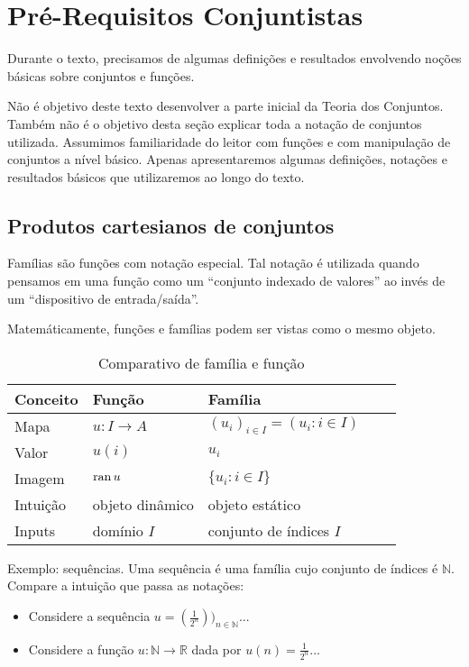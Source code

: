 
\chapter{Pré-Requisitos Conjuntistas}
Durante o texto, precisamos de algumas definições e resultados envolvendo noções básicas sobre conjuntos e funções.

Não é objetivo deste texto desenvolver a parte inicial da Teoria dos Conjuntos. Também não é o objetivo desta seção explicar toda a notação de conjuntos utilizada. Assumimos familiaridade do leitor com funções e com manipulação de conjuntos a nível básico. Apenas apresentaremos algumas definições, notações e resultados básicos que utilizaremos ao longo do texto.

\section{Produtos cartesianos de conjuntos}

Famílias são funções com notação especial. Tal notação é utilizada quando pensamos em uma função como um ``conjunto indexado de valores'' ao invés de um ``dispositivo de entrada/saída''.

Matemáticamente, funções e famílias podem ser vistas como o mesmo objeto.
\begin{table}[h]
    \centering
    \begin{tabular}{lllll}
        \hline
        \textbf{Conceito} & \textbf{Função} & \textbf{Família} \\ \hline
        Mapa & $u:I\rightarrow A$ & $(u_i)_{i \in I}=(u_i: i \in I)$ \\
        Valor & $u(i)$ & $u_i$ \\
        Imagem & $\operatorname{ran} u$ & $\{u_i: i \in I\}$\\
        Intuição & objeto dinâmico & objeto estático \\
        Inputs & domínio $I$ & conjunto de índices $I$ \\
        \hline
    \end{tabular}
    \caption{Comparativo de família e função}
\end{table}

Exemplo: sequências. Uma sequência é uma família cujo conjunto de índices é $\mathbb N$. Compare a intuição que passa as notações:
\begin{itemize}
\item Considere a sequência $u=(\frac{1}{2^n}))_{n \in \mathbb N}$...
\item Considere a função $u:\mathbb N\rightarrow \mathbb R$ dada por $u(n)=\frac{1}{2^n}$...
\end{itemize}

